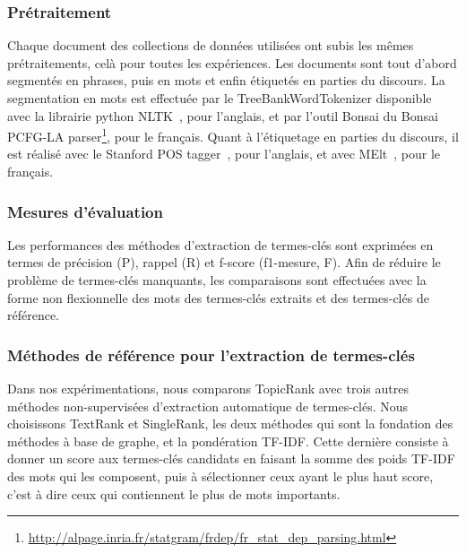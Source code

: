     \subsubsection{Prétraitement}
    \label{subsubsec:pretraitement}
      Chaque document des collections de données utilisées ont subis les mêmes
      prétraitements, celà pour toutes les expériences. Les documents sont tout
      d'abord segmentés en phrases, puis en mots et enfin étiquetés en parties
      du discours. La segmentation en mots est effectuée par le
      TreeBankWordTokenizer disponible avec la librairie python
      NLTK~\cite[\textit{Natural Language ToolKit}]{bird2009nltk}, pour
      l'anglais, et par l'outil Bonsai du Bonsai PCFG-LA
      parser\footnote{\url{http://alpage.inria.fr/statgram/frdep/fr_stat_dep_parsing.html}},
      pour le français. Quant à l'étiquetage en parties du discours, il est
      réalisé avec le Stanford POS tagger~\cite{toutanova2003stanfordpostagger},
      pour l'anglais, et avec MElt~\cite{denis2009melt}, pour le français.

    \subsubsection{Mesures d'évaluation}
    \label{subsubsec:mesures_d_evaluation}
      Les performances des méthodes d'extraction de termes-clés sont exprimées
      en termes de précision (P), rappel (R) et f-score (f1-mesure, F). Afin de
      réduire le problème de termes-clés manquants, les comparaisons sont
      effectuées avec la forme non flexionnelle des mots des termes-clés
      extraits et des termes-clés de référence.

    \subsubsection{Méthodes de référence pour l'extraction de termes-clés}
    \label{subsubsec:systemes_de_reference_pour_l_extraction_de_termes_cles}
      Dans nos expérimentations, nous comparons TopicRank avec trois autres
      méthodes non-supervisées d'extraction automatique de termes-clés. Nous
      choisissons TextRank et SingleRank, les deux méthodes qui sont la
      fondation des méthodes à base de graphe, et la pondération TF-IDF. Cette
      dernière consiste à donner un score aux termes-clés candidats en faisant
      la somme des poids TF-IDF des mots qui les composent, puis à sélectionner
      ceux ayant le plus haut score, c'est à dire ceux qui contiennent le plus
      de mots importants.

